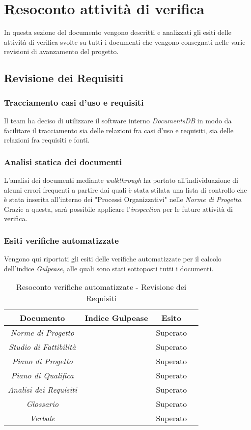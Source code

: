 \newpage
\section{Resoconto attività di verifica}
In questa sezione del documento vengono descritti e analizzati gli esiti delle attività di verifica svolte su tutti i documenti che vengono consegnati nelle varie revisioni di avanzamento del progetto.

\subsection{Revisione dei Requisiti}

\subsubsection{Tracciamento casi d'uso e requisiti}
Il team ha deciso di utilizzare il software interno \textit{DocumentsDB} in modo da facilitare il tracciamento sia delle relazioni fra casi d'uso e requisiti, sia delle relazioni fra requisiti e fonti.

\subsubsection{Analisi statica dei documenti}
L'analisi dei documenti mediante \textit{walkthrough} ha portato all'individuazione di alcuni errori frequenti a partire dai quali è stata stilata una lista di controllo che è stata inserita all'interno dei "Processi Organizzativi" nelle \textit{Norme di Progetto}. Grazie a questa, sarà possibile applicare l'\textit{inspection} per le future attività di verifica.

\subsubsection{Esiti verifiche automatizzate}
Vengono qui riportati gli esiti delle verifiche automatizzate per il calcolo dell'indice \textit{Gulpease}, alle quali sono stati sottoposti tutti i documenti.
\begin{table}[h]
\begin{center}
\begin{tabular}{|c|c|c|c|}
\hline Documento & Indice Gulpease & Esito\\
\hline
\emph{Norme di Progetto} &  & Superato \\
\emph{Studio di Fattibilità} &  & Superato \\
\emph{Piano di Progetto} &  & Superato \\
\emph{Piano di Qualifica} &   & Superato \\
\emph{Analisi dei Requisiti} &  & Superato \\
\emph{Glossario} &  & Superato \\
\emph{Verbale} &  & Superato \\
\hline
\end{tabular}
\caption{Resoconto verifiche automatizzate - Revisione dei Requisiti}
\end{center}
\end{table}